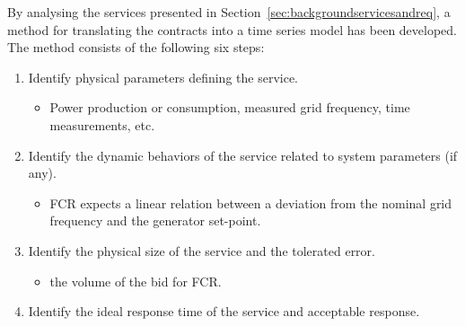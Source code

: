 By analysing the services presented in Section~\ref{sec:backgroundservicesandreq}, a method for translating the contracts into a time series model has been developed. The method consists of the following six steps:
\begin{enumerate}
  \item Identify physical parameters defining the service.
  \begin{itemize}
    \item \eg Power production or consumption, measured grid frequency, time measurements, etc.%
  \end{itemize}
  \item Identify the dynamic behaviors of the service related to system parameters (if any).
  \begin{itemize}
    \item \eg FCR expects a linear relation between a deviation from the nominal grid frequency and the generator set-point.%
  \end{itemize}
  \item Identify the physical size of the service and the tolerated error. %
  \begin{itemize}
    \item \eg the volume of the bid for FCR. %
  \end{itemize}
  \item Identify the ideal response time of the service and acceptable response.
  \begin{itemize}

\end{itemize}
\end{enumerate}
